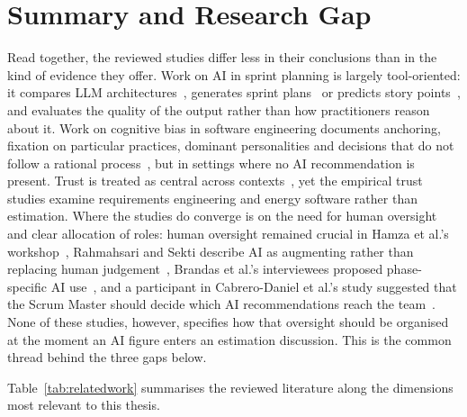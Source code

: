 \documentclass[a4paper,twoside]{bth}
\begin{document}
\section{Summary and Research Gap}
\label{sec:gap}

Read together, the reviewed studies differ less in their conclusions than in the kind of evidence they offer. Work on AI in sprint planning is largely tool-oriented: it compares LLM architectures~\cite{muneer2025leveraging}, generates sprint plans~\cite{kula2024context} or predicts story points~\cite{choetkiertikul2018deep}, and evaluates the quality of the output rather than how practitioners reason about it. Work on cognitive bias in software engineering documents anchoring, fixation on particular practices, dominant personalities and decisions that do not follow a rational process~\cite{mohanani2018cognitive, zacek2024improvements, drury2013investigation, borowa2023fixations}, but in settings where no AI recommendation is present. Trust is treated as central across contexts~\cite{aman2025systematic, alhubaishy2026exploring, tsihrintzis2025virtsi}, yet the empirical trust studies examine requirements engineering and energy software rather than estimation. Where the studies do converge is on the need for human oversight and clear allocation of roles: human oversight remained crucial in Hamza et al.'s workshop~\cite{hamza2024human}, Rahmahsari and Sekti describe AI as augmenting rather than replacing human judgement~\cite{rahmahsari2026ai}, Brandas et al.'s interviewees proposed phase-specific AI use~\cite{brandas2026social}, and a participant in Cabrero-Daniel et al.'s study suggested that the Scrum Master should decide which AI recommendations reach the team~\cite{cabrero2024exploring}. None of these studies, however, specifies how that oversight should be organised at the moment an AI figure enters an estimation discussion. This is the common thread behind the three gaps below.

Table~\ref{tab:relatedwork} summarises the reviewed literature along the dimensions most relevant to this thesis.
\end{document}
